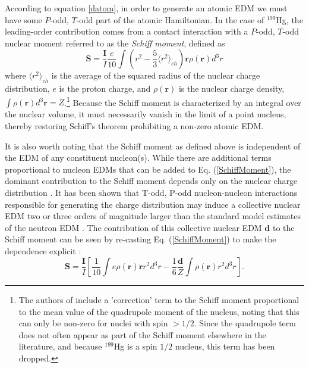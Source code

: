 \documentclass [10pt, twoside] {uwthesis}[2012/04/02]
\begin{document}
According to equation \eqref{datom}, in order to generate an atomic EDM we must have some $P$-odd, $T$-odd part of the atomic Hamiltonian. In the case of $^{199}$Hg, the leading-order contribution comes from a contact interaction with a $P$-odd, $T$-odd nuclear moment referred to as the \textit{Schiff moment}, defined as \cite{2008_Schiff_Theorem_Rederivation}
\begin{equation}\label{SchiffMoment} 
\mathbf{S} = \dfrac{\mathbf{I}}{I} \dfrac{e}{10} \int \left( r^2 - \dfrac{5}{3} \langle r^2\rangle_{ch} \right) \mathbf{r} \rho(\mathbf{r})d^3r  \end{equation}
where $\langle r^2 \rangle_{ch}$ is the average of the squared radius of the nuclear charge distribution, $e$ is the proton charge, and $\rho(\mathbf{r})$ is the nuclear charge density, $\int \rho(\mathbf{r}) d^3\mathbf{r} = Z$.\footnote{The authors of \cite{2008_Schiff_Theorem_Rederivation} include a 'correction' term to the Schiff moment proportional to the mean value of the quadrupole moment of the nucleus, noting that this can only be non-zero for nuclei with spin $> 1/2$. Since the quadrupole term does not often appear as part of the Schiff moment elsewhere in the literature, and because $^{199}$Hg is a spin $1/2$ nucleus, this term has been dropped.} Because the Schiff moment is characterized by an integral over the nuclear volume, it must necessarily vanish in the limit of a point nucleus, thereby restoring Schiff's theorem prohibiting a non-zero atomic EDM.

It is also worth noting that the Schiff moment as defined above is independent of the EDM of any constituent nucleon(s). While there are additional terms proportional to nucleon EDMs that can be added to Eq. (\ref{SchiffMoment}), the dominant contribution to the Schiff moment depends only on the nuclear charge distribution \cite[Sec. 4.2]{2013_Engel_et_al_EDM_review}. It has been shown that T-odd, P-odd nucleon-nucleon interactions responsible for generating the charge distribution may induce a collective nuclear EDM two or three orders of magnitude larger than the standard model estimates of the neutron EDM \cite{1984_Sushkov_et._al._P_T_odd_atomic_experiments}. The contribution of this collective nuclear EDM $\mathbf{d}$ to the Schiff moment can be seen by re-casting Eq. (\ref{SchiffMoment}) to make the dependence explicit \cite{2004_Ginges_Flambaum_Fund._Symmetries_in_Atoms}:
\begin{equation}\label{dSchiffMoment} \mathbf{S} = \dfrac{\mathbf{I}}{I} \left[ \dfrac{1}{10}\int e\rho(\mathbf{r})\mathbf{r}r^2d^3r - \dfrac{1}{6}\dfrac{\mathbf{d}}{Z}\int \rho(\mathbf{r})r^2d^3r \right]. \end{equation}
\end{document}
